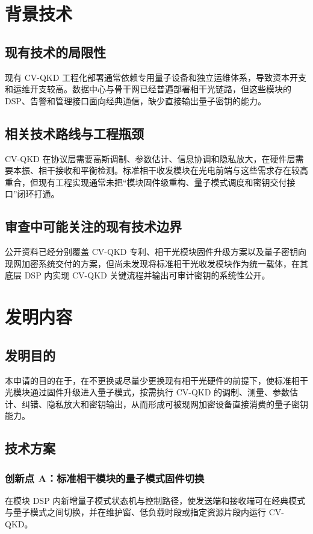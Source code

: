 ﻿\documentclass[12pt,a4paper]{article}
\begin{document}
\section{背景技术}
\subsection{现有技术的局限性}
现有 CV-QKD 工程化部署通常依赖专用量子设备和独立运维体系，导致资本开支和运维开支较高。数据中心与骨干网已经普遍部署相干光链路，但这些模块的 DSP、告警和管理接口面向经典通信，缺少直接输出量子密钥的能力。

\subsection{相关技术路线与工程瓶颈}
CV-QKD 在协议层需要高斯调制、参数估计、信息协调和隐私放大，在硬件层需要本振、相干接收和平衡检测。标准相干收发模块在光电前端与这些需求存在较高重合，但现有工程实现通常未把“模块固件级重构、量子模式调度和密钥交付接口”闭环打通。

\subsection{审查中可能关注的现有技术边界}
公开资料已经分别覆盖 CV-QKD 专利、相干光模块固件升级方案以及量子密钥向现网加密系统交付的方案，但尚未发现将标准相干光收发模块作为统一载体，在其底层 DSP 内实现 CV-QKD 关键流程并输出可审计密钥的系统性公开。

\section{发明内容}
\subsection{发明目的}
本申请的目的在于，在不更换或尽量少更换现有相干光硬件的前提下，使标准相干光模块通过固件升级进入量子模式，按需执行 CV-QKD 的调制、测量、参数估计、纠错、隐私放大和密钥输出，从而形成可被现网加密设备直接消费的量子密钥能力。

\subsection{技术方案}
\subsubsection{创新点 A：标准相干模块的量子模式固件切换}
在模块 DSP 内新增量子模式状态机与控制路径，使发送端和接收端可在经典模式与量子模式之间切换，并在维护窗、低负载时段或指定资源片段内运行 CV-QKD。
\end{document}
